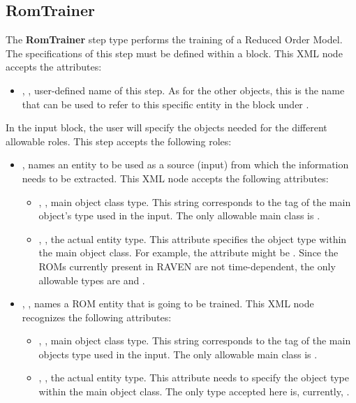 \subsection{RomTrainer}
\label{subsec:stepRomTrainer}
The \textbf{RomTrainer} step type performs the training of a Reduced Order
Model.
%
The specifications of this step must be defined within a 
block.
%
This XML node accepts the attributes:
\vspace{-5mm}
\begin{itemize}
\itemsep0em
\item {}, , user-defined name of
this step.
\nb As for the other objects, this is the name that can be used to refer to this
specific entity in the  block under .
\end{itemize}
\vspace{-5mm}
In the  input block, the user will specify the objects 
needed for the different allowable roles.
%
This step accepts the following roles:
\begin{itemize}
\item {},  names an entity to 
be used as a source (input) from which the information needs to be extracted.
This XML node accepts the following attributes:
  \begin{itemize}
  \item {}, , main object class
    type.
    This string corresponds to the tag of the main object's type used in the
    input.
    The only allowable main class is .
  \item {}, , the actual entity
    type.
    This attribute specifies the object type within the main object class.
    For example, the  attribute might be .
    \nb Since the ROMs currently present in RAVEN are not time-dependent, the
    only allowable types are  and .
  \end{itemize}
\item {}, , names a ROM entity
  that is going to be trained.
  This XML node recognizes the following attributes:
  \begin{itemize}
  \item {}, , main object class
    type.
    This string corresponds to the tag of the main objects type used in the
    input.
    The only allowable main class is .
  \item {}, , the actual entity
    type.
    This attribute needs to specify the object type within the main object
    class.
    The only type accepted here is, currently, .
  \end{itemize}
\end{itemize}

